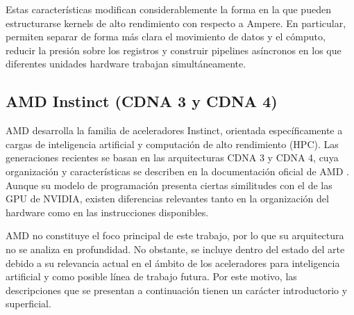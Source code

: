 \begin{itemize}
\end{itemize}

Estas características modifican considerablemente la forma en la que pueden estructurarse kernels de alto rendimiento con respecto a Ampere. En particular, permiten separar de forma más clara el movimiento de datos y el cómputo, reducir la presión sobre los registros y construir pipelines asíncronos en los que diferentes unidades hardware trabajan simultáneamente.

\subsection{AMD Instinct (CDNA 3 y CDNA 4)}

AMD desarrolla la familia de aceleradores Instinct, orientada específicamente a cargas de inteligencia artificial y computación de alto rendimiento (HPC). Las generaciones recientes se basan en las arquitecturas CDNA 3 y CDNA 4, cuya organización y características se describen en la documentación oficial de AMD \cite{amdCDNA}. Aunque su modelo de programación presenta ciertas similitudes con el de las GPU de NVIDIA, existen diferencias relevantes tanto en la organización del hardware como en las instrucciones disponibles.

AMD no constituye el foco principal de este trabajo, por lo que su arquitectura no se analiza en profundidad. No obstante, se incluye dentro del estado del arte debido a su relevancia actual en el ámbito de los aceleradores para inteligencia artificial y como posible línea de trabajo futura. Por este motivo, las descripciones que se presentan a continuación tienen un carácter introductorio y superficial.

